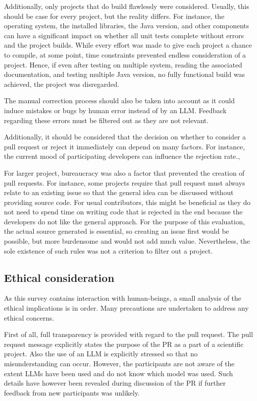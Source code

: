Additionally, only projects that do build flawlessly were considered. Usually, this should be case for every project, but the reality differs. For instance, the operating system, the installed libraries, the Java version, and other components can have a significant impact on whether all unit tests complete without errors and the project builds.  While every effort was made to give each project a chance to compile, at some point, time constraints prevented endless consideration of a project. Hence, if even after testing on multiple system, reading the associated documentation, and testing multiple Java version, no fully functional build was achieved, the project was disregarded.

The manual correction process should also be taken into account as it could induce mistakes or bugs by human error instead of by an \ac{LLM}. Feedback regarding these errors must be filtered out as they are not relevant. 


Additionally, it should be considered that the decision on whether to consider a pull request or reject it immediately can depend on many factors. For instance,  the current mood of participating developers can influence the rejection rate.\cite{detecting_emotional}, 

For larger project, bureaucracy was also a factor that prevented the creation of pull requests. For instance, some projects require that pull request must always relate to an existing issue so that the general idea can be discussed without providing source code. For usual contributors, this might be beneficial as they do not need to spend time on writing code that is rejected in the end because the developers do not like the general approach. For the purpose of this evaluation, the actual source generated is essential, so creating an issue first would be possible,  but more burdensome  and would not add much value. Nevertheless, the sole existence of such rules was not a criterion to filter out a project. 

\subsection{Ethical consideration}
As this survey contains interaction with human-beings, a small analysis of the ethical implications is in order. Many precautions are undertaken to address any ethical concerns. 

First of all, full transparency is provided  with regard to the pull request. The pull request message explicitly states the purpose of the PR as a part of a scientific project. Also the use of an \ac{LLM} is explicitly stressed so that no misunderstanding can occur. However, the participants are not aware of the extent \acp{LLM} have been used and do not know which model was used. Such details have however been revealed during discussion of the PR if further feedback from new participants was unlikely.

